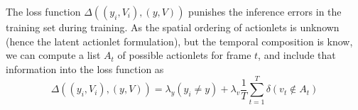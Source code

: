 The loss function $\Delta((y_i,V_i),(y,V))$ punishes the inference errors in the training set during training. As the spatial ordering of actionlets is unknown (hence the latent actionlet formulation), but the temporal composition is know, we can compute a list $A_t$ of possible actionlets for frame $t$, and include  that information into the loss function as
\begin{equation}
\Delta((y_i,V_i),(y,V)) = \lambda_y(y_i \ne y) + \lambda_v\frac{1}{T}\sum_{t=1}^T 
\delta(v_t \notin A_t)
\end{equation}

